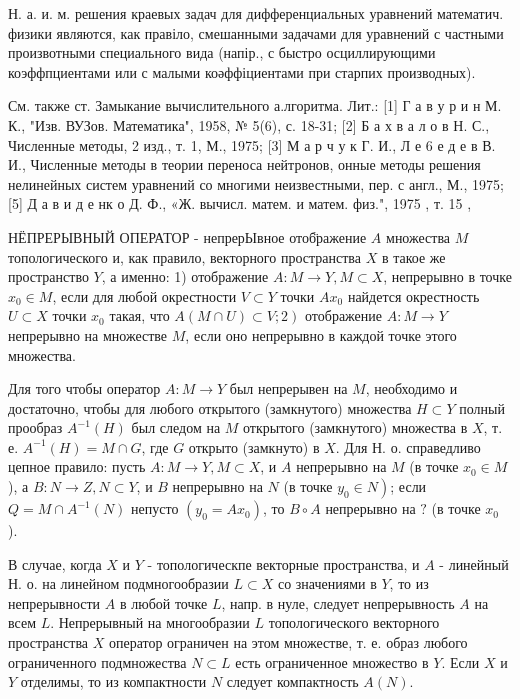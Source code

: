 \documentclass[10pt]{article}
\begin{document}
Н. а. и. м. решения краевых задач для дифференциальных уравнений математич. физики являются, как правіло, смешанными задачами для уравнений с частными произвотными специального вида (напір., с быстро осциллирующими коэффпциентами или с малыми коәффіциентами при старпих производных).



См. также ст. Замыкание вычислительного а.лгоритма. Лит.: [1] Г а в у р и н М. К., "Изв. ВУЗов. Математика", 1958, № 5(6), с. 18-31; [2] Б а х в а л о в Н. С., Численные методы, 2 изд., т. 1, М., 1975; [3] М а р ч у к Г. И., Л е 6 е д е в В. И., Численные методы в теории переноса нейтронов, онные методы решения нелинейных систем уравнений со многими неизвестными, пер. с англ., М., 1975; [5] Д а в и д е нк о Д. Ф., «Ж. вычисл. матем. и матем. физ.", 1975 , т. 15 ,



НЁПРЕРЫВНЫЙ ОПЕРАТОР - непрерЫвное отоб̈ражение $A$ множества $M$ топологического и, как правило, векторного пространства $X$ в такое же пространство $Y$, а именно: 1) отображение $A: M \rightarrow Y, M \subset X$, непрерывно в точке $x_{0} \in M$, если для любой окрестности $V \subset Y$ точки $A x_{0}$ найдется окрестность $U \subset X$ точки $x_{0}$ такая, что $\left.A(M \cap U) \subset V ; 2\right)$ отображение $A: M \rightarrow Y$ непрерывно на множестве $M$, если оно непрерывно в каждой точке этого множества.



Для того чтобы оператор $A: M \rightarrow Y$ был непрерывен на $M$, необходимо и достаточно, чтобы для любого открытого (замкнутого) множества $H \subset Y$ полный прообраз $A^{-1}(H)$ был следом на $M$ открытого (замкнутого) множества в $X$, т. е. $A^{-1}(H)=M \cap G$, где $G$ открыто (замкнуто) в $X$. Для Н. о. справедливо цепное правило: пусть $A: M \rightarrow Y, M \subset X$, и $A$ непрерывно на $M$ (в точке $x_{0} \in M$ ), а $B: N \rightarrow Z, N \subset Y$, и $B$ непрерывно на $N$ (в точке $\left.y_{0} \in N\right)$; если $Q=M \cap A^{-1}(N)$ непусто $\left(y_{0}=A x_{0}\right)$, то $B \circ A$ непрерывно на $?$ (в точке $x_{0}$ ).



В случае, когда $X$ и $Y$ - топологическпе векторные пространства, и $A$ - линейный Н. о. на линейном подмногообразии $L \subset X$ со значениями в $Y$, то из непрерывности $A$ в любой точке $L$, напр. в нуле, следует непрерывность $A$ на всем $L$. Непрерывный на многообразии $L$ топологического векторного пространства $X$ оператор ограничен на этом множестве, т. е. образ любого ограниченного подмножества $N \subset L$ есть ограниченное множество в $Y$. Если $X$ и $Y$ отделимы, то из компактности $N$ следует компактность $A(N)$.
\end{document}
